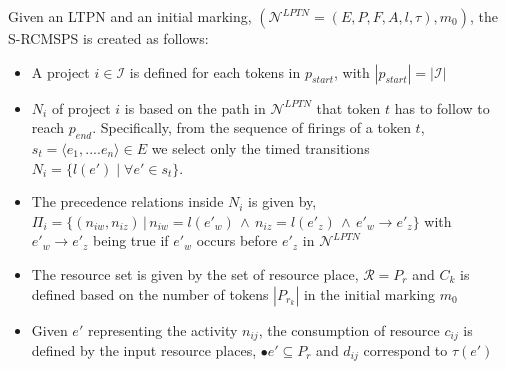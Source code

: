 \begin{define}
Given an LTPN and an initial marking, $(\mathcal{N}^{LPTN} = (E, P, F, A, l, \tau), m_0)$, the S-RCMSPS is created as follows:
\begin{itemize}
    \item A project $i \in \mathcal{I}$ is defined for each tokens in $p_{start}$, with $|p_{start}| = |\mathcal{I}|$
    \item $N_i$ of project $i$ is based on the path in $\mathcal{N}^{LPTN}$ that token $t$ has to follow to reach $p_{end}$. Specifically, from the sequence of firings of a token $t$, $s_t = \langle e_1, .... e_n \rangle \in E$ we select only the timed transitions $N_i = \{l(e') \; | \; \forall e' \in s_t\}$.
    \item The precedence relations inside $N_i$ is given by, $\Pi_i = \{ (n_{iw}, n_{iz}) \, | \, n_{iw} = l(e'_w) \, \wedge \, n_{iz} = l(e'_z) \, \wedge \, e'_w \rightarrow e'_z \}$ with $e'_w \rightarrow e'_z$ being true if $e'_w$ occurs before $e'_z$ in $\mathcal{N}^{LPTN}$
    \item The resource set is given by the set of resource place, $\mathcal{R} = P_r$ and $C_k$ is defined based on the number of tokens $|P_{r_k}|$ in the initial marking $m_0$
    \item Given $e'$ representing the activity $n_{ij}$, the consumption of resource $c_{ij}$ is defined by the input resource places, $\bullet e' \subseteq P_r$ and $d_{ij}$ correspond to $\tau(e')$
\end{itemize}
\end{define}



